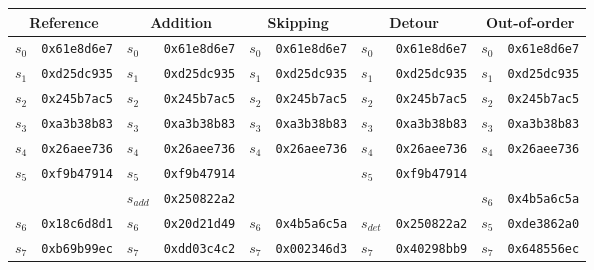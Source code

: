 \begin{table}
    \newcommand{\red}{\cellcolor{red!50}}
    \newcommand{\headersize}{\small}
    \centering
    \scriptsize
    \begin{tabularx}{\linewidth}{ll|ll|ll|ll|ll}
        \hline
        \multicolumn{2}{c|}{\headersize Reference} & \multicolumn{2}{c|}{\headersize Addition} & \multicolumn{2}{c|}{\headersize Skipping} & \multicolumn{2}{c|}{\headersize Detour} & \multicolumn{2}{c}{\headersize Out-of-order} \\
         \hline
         \hline%
         $s_0$   &\texttt{0x61e8d6e7}&$s_0$        &\texttt{0x61e8d6e7}    &$s_0$       &\texttt{0x61e8d6e7}    &$s_0$        &\texttt{0x61e8d6e7}    &$s_0$        &\texttt{0x61e8d6e7}     \\
         $s_1$   &\texttt{0xd25dc935}&$s_1$        &\texttt{0xd25dc935}    &$s_1$       &\texttt{0xd25dc935}    &$s_1$        &\texttt{0xd25dc935}    &$s_1$        &\texttt{0xd25dc935}     \\
         $s_2$   &\texttt{0x245b7ac5}&$s_2$        &\texttt{0x245b7ac5}    &$s_2$       &\texttt{0x245b7ac5}    &$s_2$        &\texttt{0x245b7ac5}    &$s_2$        &\texttt{0x245b7ac5}     \\
         $s_3$   &\texttt{0xa3b38b83}&$s_3$        &\texttt{0xa3b38b83}    &$s_3$       &\texttt{0xa3b38b83}    &$s_3$        &\texttt{0xa3b38b83}    &$s_3$        &\texttt{0xa3b38b83}     \\
         $s_4$   &\texttt{0x26aee736}&$s_4$        &\texttt{0x26aee736}    &$s_4$       &\texttt{0x26aee736}    &$s_4$        &\texttt{0x26aee736}    &$s_4$        &\texttt{0x26aee736}     \\
         $s_5$   &\texttt{0xf9b47914}&$s_5$        &\texttt{0xf9b47914}    &            &                       &$s_5$        &\texttt{0xf9b47914}    &             &                        \\
                 &                   &\red$s_{add}$&\red\texttt{0x250822a2}&            &                       &             &                       &\red$s_6$    &\red\texttt{0x4b5a6c5a} \\
         $s_6$   &\texttt{0x18c6d8d1}&\red$s_6$    &\red\texttt{0x20d21d49}&\red$s_6$   &\red\texttt{0x4b5a6c5a}&\red$s_{det}$&\red\texttt{0x250822a2}&\red$s_5$    &\red\texttt{0xde3862a0} \\
         $s_7$   &\texttt{0xb69b99ec}&\red$s_7$    &\red\texttt{0xdd03c4c2}&\red$s_7$   &\red\texttt{0x002346d3}&\red$s_7$    &\red\texttt{0x40298bb9}&\red$s_7$    &\red\texttt{0x648556ec} \\

\end{tabularx}
\end{table}
